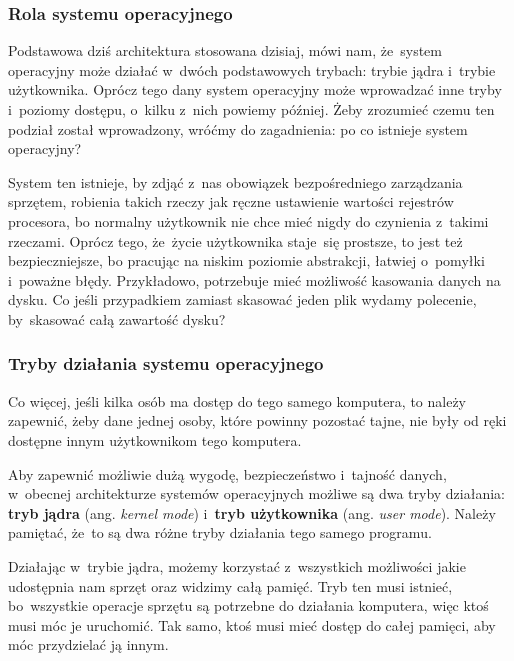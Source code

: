 \documentclass[10pt,t]{beamer}
\begin{document}
\begin{frame}
  \frametitle{Rola systemu operacyjnego}


  Podstawowa dziś architektura stosowana dzisiaj, mówi nam, że~system
  operacyjny może działać w~dwóch podstawowych trybach: trybie jądra
  i~trybie użytkownika. Oprócz tego dany system operacyjny może wprowadzać
  inne tryby i~poziomy dostępu, o~kilku z~nich powiemy później. Żeby
  zrozumieć czemu ten podział został wprowadzony, wróćmy do zagadnienia:
  po co istnieje system operacyjny?

  System ten istnieje, by zdjąć z~nas obowiązek bezpośredniego zarządzania
  sprzętem, robienia takich rzeczy jak ręczne ustawienie wartości rejestrów
  procesora, bo normalny użytkownik nie chce mieć nigdy do czynienia
  z~takimi rzeczami. Oprócz tego, że~życie użytkownika staje~się prostsze,
  to jest też bezpieczniejsze, bo pracując na niskim poziomie abstrakcji,
  łatwiej o~pomyłki i~poważne błędy. Przykładowo, potrzebuje mieć możliwość
  kasowania danych na dysku. Co jeśli przypadkiem zamiast skasować jeden
  plik wydamy polecenie, by~skasować całą zawartość dysku?

\end{frame}





\begin{frame}
  \frametitle{Tryby działania systemu operacyjnego}


  Co więcej, jeśli kilka osób ma dostęp do tego samego komputera, to
  należy zapewnić, żeby dane jednej osoby, które powinny pozostać tajne, nie
  były od ręki dostępne innym użytkownikom tego komputera.

  Aby zapewnić możliwie dużą wygodę, bezpieczeństwo i~tajność danych,
  w~obecnej architekturze systemów operacyjnych możliwe są dwa tryby
  działania: \textbf{tryb jądra} (ang. \textit{kernel mode})
  i~\textbf{tryb użytkownika} (ang. \textit{user mode}). Należy pamiętać,
  że~to są dwa różne tryby działania tego samego programu.

  Działając w~trybie jądra, możemy korzystać z~wszystkich możliwości jakie
  udostępnia nam sprzęt oraz widzimy całą pamięć. Tryb ten musi istnieć,
  bo~wszystkie operacje sprzętu są potrzebne do działania komputera, więc
  ktoś musi móc je uruchomić. Tak samo, ktoś musi mieć dostęp do całej
  pamięci, aby móc przydzielać ją innym.

\end{frame}
\end{document}
